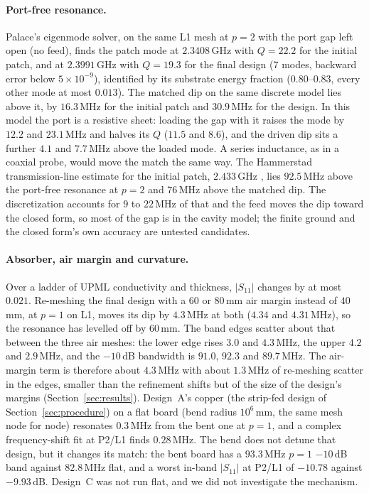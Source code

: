 \documentclass{anvil-paper}
\newcommand{\PL}{P2/L1}
\begin{document}
\paragraph{Port-free resonance.}
Palace's eigenmode solver, on the same L1 mesh at $p = 2$ with the port gap
left open (no feed), finds the patch mode at $2.3408$\,GHz with $Q = 22.2$
for the initial patch, and at $2.3991$\,GHz with $Q = 19.3$ for the final
design (7 modes, backward error below $5\times10^{-9}$), identified by its
substrate energy fraction ($0.80$--$0.83$, every other mode at most
$0.013$). The matched dip on the same discrete model lies above it, by
$16.3$\,MHz for the initial patch and $30.9$\,MHz for the design. In this
model the port is a resistive sheet: loading the gap with it raises the mode
by $12.2$ and $23.1$\,MHz and halves its $Q$ ($11.5$ and $8.6$), and the driven
dip sits a further $4.1$ and $7.7$\,MHz above the loaded mode. A series
inductance, as in a coaxial probe, would move the match the same way.
The Hammerstad transmission-line estimate for the initial patch,
$2.433$\,GHz \citep{hammerstad1975equations}, lies $92.5$\,MHz above the
port-free resonance at $p = 2$ and $76$\,MHz above the matched dip. The
discretization accounts for $9$ to $22$\,MHz of that and the feed moves the
dip toward the closed form, so most of the gap is in the cavity model; the
finite ground and the closed form's own accuracy are untested candidates.

\paragraph{Absorber, air margin and curvature.}
Over a ladder of UPML conductivity and thickness, $|S_{11}|$ changes by at
most $0.021$. Re-meshing the final design with a $60$ or $80$\,mm air margin
instead of $40$\,mm, at $p = 1$ on L1, moves its dip by $4.3$\,MHz at both
($4.34$ and $4.31$\,MHz), so the resonance has levelled off by $60$\,mm. The
band edges scatter about that between the three air meshes: the lower edge
rises $3.0$ and $4.3$\,MHz, the upper $4.2$ and $2.9$\,MHz, and the $-10$\,dB
bandwidth is $91.0$, $92.3$ and $89.7$\,MHz. The air-margin term is therefore
about $4.3$\,MHz with about $1.3$\,MHz of re-meshing scatter in the edges,
smaller than the refinement shifts but of the size of the design's margins
(Section~\ref{sec:results}).
Design~A's copper (the strip-fed design of Section~\ref{sec:procedure}) on
a flat board (bend radius $10^6$\,mm, the same mesh node for node)
resonates $0.3$\,MHz from the bent one at $p = 1$, and a complex
frequency-shift fit at \PL{} finds $0.28$\,MHz. The bend does not detune
that design, but it changes its match: the bent board has a $93.3$\,MHz
$p = 1$ $-10$\,dB band against $82.8$\,MHz flat, and a worst in-band
$|S_{11}|$ at \PL{} of $-10.78$ against $-9.93$\,dB. Design~C was not run
flat, and we did not investigate the mechanism.
\end{document}
